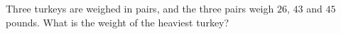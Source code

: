 Three turkeys are weighed in pairs, and the three pairs weigh $26$, $43$ and $45$ pounds. What is the weight of the heaviest turkey?
